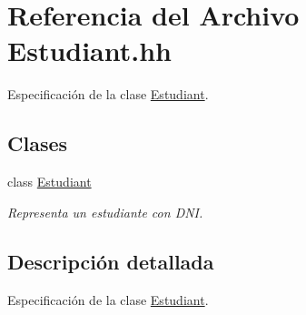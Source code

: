 \hypertarget{_estudiant_8hh}{}\section{Referencia del Archivo Estudiant.\+hh}
\label{_estudiant_8hh}


Especificación de la clase \hyperlink{class_estudiant}{Estudiant}.  


\subsection*{Clases}
\begin{DoxyCompactItemize}
\item 
class \hyperlink{class_estudiant}{Estudiant}
\begin{DoxyCompactList}\small\item\em Representa un estudiante con D\+NI. \end{DoxyCompactList}\end{DoxyCompactItemize}


\subsection{Descripción detallada}
Especificación de la clase \hyperlink{class_estudiant}{Estudiant}. 


